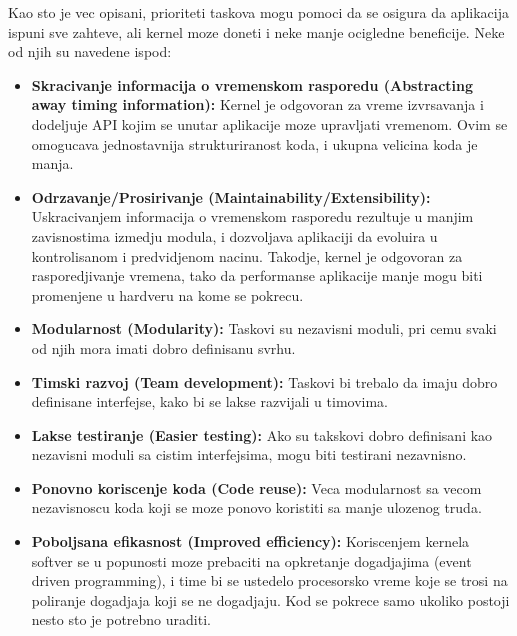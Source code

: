 \documentclass[a4paper,12pt, master]{etf}
\begin{document}
	Kao sto je vec opisani, prioriteti taskova mogu pomoci da se osigura da aplikacija ispuni 
	sve	zahteve, ali kernel moze doneti i neke manje ocigledne beneficije. Neke od njih su 
	navedene ispod:
	
	\begin{itemize}
		\item \textbf{Skracivanje informacija o vremenskom rasporedu (Abstracting away timing 
		information):} Kernel je odgovoran za vreme izvrsavanja i dodeljuje API kojim se 
		unutar aplikacije moze upravljati vremenom. Ovim se omogucava jednostavnija 
		strukturiranost koda, i ukupna velicina koda je manja.
		\item \textbf{Odrzavanje/Prosirivanje (Maintainability/Extensibility):}
		Uskracivanjem informacija o vremenskom rasporedu rezultuje u manjim zavisnostima 
		izmedju	modula, i dozvoljava aplikaciji da evoluira u kontrolisanom i predvidjenom 
		nacinu. Takodje, kernel je odgovoran za rasporedjivanje vremena, tako da performanse 
		aplikacije manje mogu biti promenjene u hardveru na kome se pokrecu.
		\item \textbf{Modularnost (Modularity):}
		Taskovi su nezavisni moduli, pri cemu svaki od njih mora imati dobro definisanu svrhu.
		\item \textbf{Timski razvoj (Team development):}
		Taskovi bi trebalo da imaju dobro definisane interfejse, kako bi se lakse razvijali u
		timovima.
		\item \textbf{Lakse testiranje (Easier testing):}
		Ako su takskovi dobro definisani kao nezavisni moduli sa cistim interfejsima, mogu biti
		testirani nezavnisno.
		\item \textbf{Ponovno koriscenje koda (Code reuse):}
		Veca modularnost sa vecom nezavisnoscu koda koji se moze ponovo koristiti sa manje 
		ulozenog truda.
		\item \textbf{Poboljsana efikasnost (Improved efficiency):}
		Koriscenjem kernela softver se u popunosti moze prebaciti na opkretanje dogadjajima 
		(event driven programming), i time bi se ustedelo procesorsko vreme koje se trosi na 
		poliranje dogadjaja koji se ne dogadjaju. Kod se pokrece samo ukoliko postoji nesto 
		sto je potrebno	uraditi.


\end{itemize}
\end{document}
